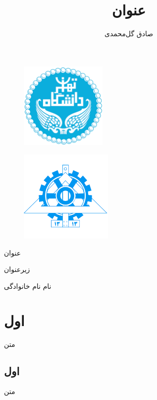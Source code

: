 \documentclass[12pt,onecolumn,a4paper]{article}
\begin{document}
\begin{titlepage}
\thispagestyle{empty}

\begin{figure}[ht]
\raggedleft
\includegraphics[height = 4.2 cm ,width=4.2cm]{UT_logo_md.png}
\label{دانشگاه تهران}
\endminipage
{}
\raggedright
\includegraphics[height = 4.5 cm ,width=4.5cm]{UT_logo_fanni_md.png}
\label{دانشکده فنی}
\endminipage
\end{figure}

\begin{center}
\vspace{1.2cm}
\Huge
عنوان

\vspace{0.8cm}
\LARGE
زیرعنوان

\vspace{2.8cm}
\LARGE
	نام نام خانوادگی


\vspace{2.8cm}
\large
\the\persianyear{}
\end{center}

\newpage
\end{titlepage}

\title{عنوان}
\author{صادق گل‌محمدی}
\date{}


\section{اول}
متن
\subsection{اول}
متن
\end{document}
